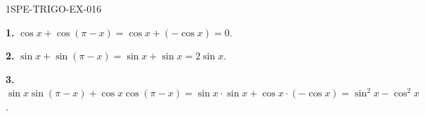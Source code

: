 \begin{corrige}{1SPE-TRIGO-EX-016}

\textbf{1.} $\cos x + \cos(\pi-x) = \cos x + (-\cos x) = 0$.

\textbf{2.} $\sin x + \sin(\pi-x) = \sin x + \sin x = 2\sin x$.

\textbf{3.} $\sin x \sin(\pi-x) + \cos x \cos(\pi-x) = \sin x \cdot \sin x + \cos x \cdot (-\cos x) = \sin^2 x - \cos^2 x$.

\end{corrige}

